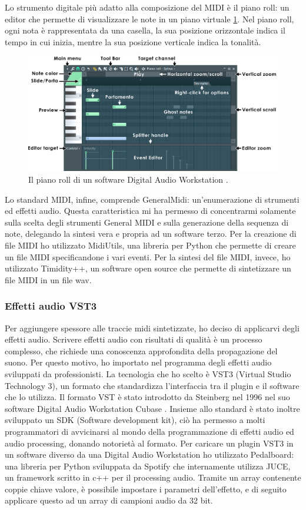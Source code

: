 Lo strumento digitale più adatto alla composizione del MIDI è il piano roll: un editor che permette di visualizzare le note in un piano virtuale \ref{fig:pianoroll}. 
Nel piano roll, ogni nota è rappresentata da una casella, la sua posizione orizzontale indica il tempo in cui inizia, mentre la sua posizione verticale indica la tonalità.
\begin{figure}[H]
    \includegraphics[width=\linewidth,scale=0.2]{img/pianoroll.png}
    \caption{Il piano roll di un software Digital Audio Workstation \cite{pianoroll_img}.}
    \label{fig:pianoroll}
\end{figure}
Lo standard MIDI, infine, comprende GeneralMidi: un'enumerazione di strumenti ed effetti audio.
Questa caratteristica mi ha permesso di concentrarmi solamente sulla scelta degli strumenti General MIDI e sulla generazione della sequenza di note, delegando la sintesi vera e propria ad un software terzo.
Per la creazione di file MIDI ho utilizzato MidiUtils, una libreria per Python che permette di creare un file MIDI specificandone i vari eventi.
Per la sintesi del file MIDI, invece, ho utilizzato Timidity++, un software open source che permette di sintetizzare un file MIDI in un file wav.
\subsubsection{Effetti audio VST3}
Per aggiungere spessore alle traccie midi sintetizzate, ho deciso di applicarvi degli effetti audio.
Scrivere effetti audio con risultati di qualità è un processo complesso, che richiede una conoscenza approfondita della propagazione del suono.
Per questo motivo, ho importato nel programma degli effetti audio sviluppati da professionisti.
La tecnologia che ho scelto è VST3 (Virtual Studio Technology 3), un formato che standardizza l'interfaccia tra il plugin e il software che lo utilizza.
Il formato VST è stato introdotto da Steinberg nel 1996 nel suo software Digital Audio Workstation Cubase \cite{vst3}. Insieme allo standard è stato inoltre sviluppato un SDK (Software development kit), ciò ha permesso a molti programmatori
di avvicinarsi al mondo della programmazione di effetti audio ed audio processing, donando notorietà al formato.
Per caricare un plugin VST3 in un software diverso da una Digital Audio Workstation ho utilizzato Pedalboard: una libreria per Python sviluppata da Spotify che internamente utilizza JUCE, un framework scritto in c++ per il processing audio.
Tramite un array contenente coppie chiave valore, è possibile impostare i parametri dell'effetto, e di seguito applicare questo ad un array di campioni audio da 32 bit.
